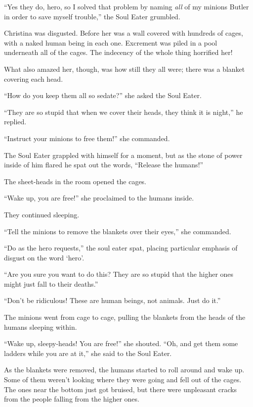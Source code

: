 \documentclass[showtrims,b6paper,draft,10pt]{memoir}
\begin{document}
``Yes they do, hero, so I solved that problem by naming \emph{all} of my minions Butler in order to save myself trouble,'' the Soul Eater grumbled.

\timeskip
Christina was disgusted.  Before her was a wall covered with hundreds of cages, with a naked human being in each one.  Excrement was piled in a pool underneath all of the cages.  The indecency of the whole thing horrified her!

What also amazed her, though, was how still they all were;  there was a blanket covering each head.

``How do you keep them all so sedate?''  she asked the Soul Eater.

``They are so stupid that when we cover their heads, they think it is night,'' he replied.

``Instruct your minions to free them!''  she commanded.

The Soul Eater grappled with himself for a moment, but as the stone of power inside of him flared he spat out the words, ``Release the humans!''

The sheet-heads in the room opened the cages.

``Wake up, you are free!'' she proclaimed to the humans inside.

They continued sleeping.

``Tell the minions to remove the blankets over their eyes,''  she commanded.

``Do as the hero requests,'' the soul eater spat, placing particular emphasis of disgust on the word `hero'.

``Are you sure you want to do this?  They are so stupid that the higher ones might just fall to their deaths.''

``Don't be ridiculous!  These are human beings, not animals.  Just do it.''

The minions went from cage to cage, pulling the blankets from the heads of the humans sleeping within.

``Wake up, sleepy-heads!  You are free!'' she shouted.  ``Oh, and get them some ladders while you are at it,'' she said to the Soul Eater.

As the blankets were removed, the humans started to roll around and wake up.  Some of them weren't looking where they were going and fell out of the cages.  The ones near the bottom just got bruised, but there were unpleasant cracks from the people falling from the higher ones.
\end{document}
